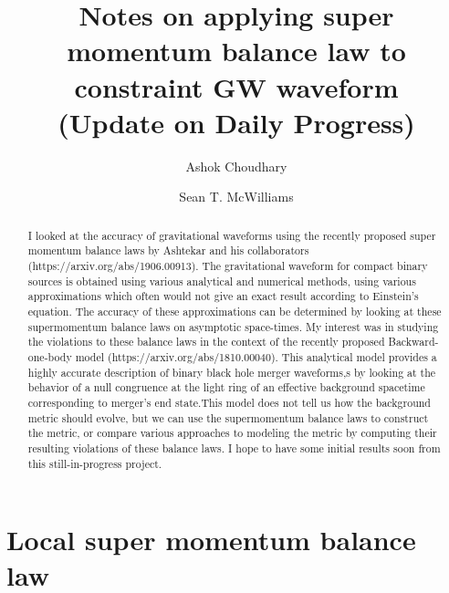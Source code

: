 \documentclass[prd,preprintnumbers,onecolumn,eqsecnum,floatfix,letter]{revtex4}
\begin{document}
\newcommand{\be}{\begin{equation}}
\newcommand{\ee}{\end{equation}}
\newcommand{\ber}{\begin{eqnarray}}
\newcommand{\eer}{\end{eqnarray}}
\def\bea{\begin{eqnarray}}
\def\eea{\end{eqnarray}}
\newcommand{\etal}{\emph{et al.}}


\title{Notes on applying super momentum balance law to constraint GW waveform \\ (Update on Daily Progress) }
\author{Ashok Choudhary}
\author{Sean T. McWilliams}

\begin{abstract}
	I looked at the accuracy of gravitational waveforms using the recently proposed super momentum balance laws by Ashtekar and his collaborators (https://arxiv.org/abs/1906.00913). The gravitational waveform for compact binary sources is obtained using various analytical and numerical methods, using various approximations which often would not give an exact result according to Einstein’s equation. The accuracy of these approximations can be determined by looking at these supermomentum balance laws on asymptotic space-times. My interest was in studying the violations to these balance laws in the context of the recently proposed Backward-one-body model (https://arxiv.org/abs/1810.00040). This analytical model provides a highly accurate description of binary black hole merger waveforms,s by looking at the behavior of a null congruence at the light ring of an effective background spacetime corresponding to merger’s end state.This model does not tell us how the background metric should evolve, but we can use the supermomentum balance laws to construct the metric, or compare various approaches to modeling the metric by computing their resulting violations of these balance laws. I hope to have some initial results soon from this still-in-progress project.
\end{abstract}

\maketitle

\section{Local super momentum balance law}
\end{document}
